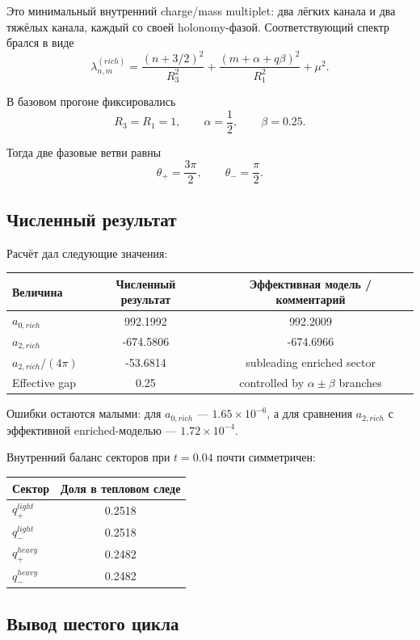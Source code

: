 \documentclass[12pt,a4paper]{article}
\begin{document}
Это минимальный внутренний charge/mass multiplet: два лёгких канала и два тяжёлых канала, каждый со своей holonomy-фазой. Соответствующий спектр брался в виде
\[
\lambda_{n,m}^{(rich)}=\frac{(n+3/2)^2}{R_3^2}+\frac{(m+\alpha+q\beta)^2}{R_1^2}+\mu^2.
\]

В базовом прогоне фиксировались
\[
R_3=R_1=1,\qquad \alpha=\frac{1}{2},\qquad \beta=0.25.
\]

Тогда две фазовые ветви равны
\[
\theta_+=\frac{3\pi}{2},
\qquad
\theta_-=\frac{\pi}{2}.
\]

\subsection{Численный результат}

Расчёт дал следующие значения:
\begin{center}
\begin{tabular}{lcc}
\toprule
Величина & Численный результат & Эффективная модель / комментарий \\
\midrule
$a_{0,rich}$ & 992.1992 & 992.2009 \\
$a_{2,rich}$ & -674.5806 & -674.6966 \\
$a_{2,rich}/(4\pi)$ & -53.6814 & subleading enriched sector \\
Effective gap & 0.25 & controlled by $\alpha\pm\beta$ branches \\
\bottomrule
\end{tabular}
\end{center}

Ошибки остаются малыми: для \(a_{0,rich}\) --- \(1.65\times 10^{-6}\), а для сравнения \(a_{2,rich}\) с эффективной enriched-моделью --- \(1.72\times 10^{-4}\).

Внутренний баланс секторов при \(t=0.04\) почти симметричен:
\begin{center}
\begin{tabular}{lc}
\toprule
Сектор & Доля в тепловом следе \\
\midrule
$q_+^{light}$ & 0.2518 \\
$q_-^{light}$ & 0.2518 \\
$q_+^{heavy}$ & 0.2482 \\
$q_-^{heavy}$ & 0.2482 \\
\bottomrule
\end{tabular}
\end{center}

\subsection{Вывод шестого цикла}
\end{document}
